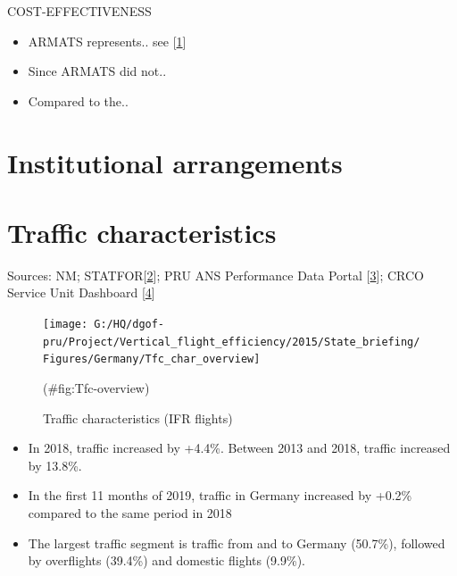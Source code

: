 \documentclass[
]{article}
\providecommand{\tightlist}{%
  \setlength{\itemsep}{0pt}\setlength{\parskip}{0pt}}
\begin{document}
COST-EFFECTIVENESS

\begin{itemize}
\item
  ARMATS represents.. see {[}\protect\hyperlink{ref-pru:ace-report-2015}{1}{]}
\item
  Since ARMATS did not..
\item
  Compared to the..
\end{itemize}

\newpage

\tableofcontents

\newpage

\listoffigures

\newpage

\hypertarget{institutional-arrangements}{%
\section{Institutional arrangements}\label{institutional-arrangements}}

\newpage

\hypertarget{traffic-characteristics}{%
\section{Traffic characteristics}\label{traffic-characteristics}}

Sources: NM; STATFOR{[}\protect\hyperlink{ref-7year-forecast-2019}{2}{]}; PRU ANS Performance Data Portal {[}\protect\hyperlink{ref-ANS-perf-data-portal}{3}{]}; CRCO Service Unit Dashboard {[}\protect\hyperlink{ref-service-unit-dashboard}{4}{]}

\begin{figure}

{\centering \texttt{[image: G:/HQ/dgof-pru/Project/Vertical\_flight\_efficiency/2015/State\_briefing/Figures/Germany/Tfc\_char\_overview]} 

}

\caption{Traffic characteristics (IFR flights)}(\#fig:Tfc-overview)
\end{figure}

\begin{itemize}
\tightlist
\item
  In 2018, traffic increased by +4.4\%. Between 2013 and 2018, traffic increased by 13.8\%.
\item
  In the first 11 months of 2019, traffic in Germany increased by +0.2\% compared to the same period in 2018
\item
  The largest traffic segment is traffic from and to Germany (50.7\%), followed by overflights (39.4\%) and domestic flights (9.9\%).
\end{itemize}
\end{document}
